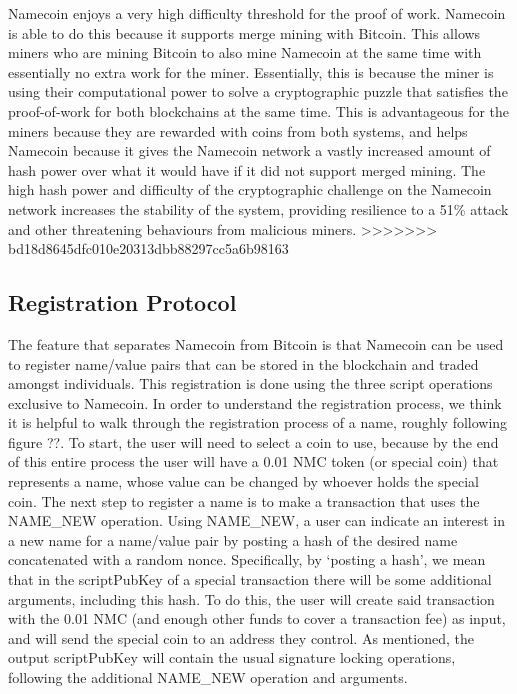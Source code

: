 Namecoin enjoys a very high difficulty threshold for the proof of work. Namecoin is able to do this because it supports merge mining with Bitcoin. This allows miners who are mining Bitcoin to also mine Namecoin at the same time with essentially no extra work for the miner. Essentially, this is because the miner is using their computational power to solve a cryptographic puzzle that satisfies the proof-of-work for both blockchains at the same time. This is advantageous for the miners because they are rewarded with coins from both systems, and helps Namecoin because it gives the Namecoin network a vastly increased amount of hash power over what it would have if it did not support merged mining. The high hash power and difficulty of the cryptographic challenge on the Namecoin network increases the stability of the system, providing resilience to a 51\% attack and other threatening behaviours from malicious miners. 
>>>>>>> bd18d8645dfc010e20313dbb88297cc5a6b98163


\subsection{Registration Protocol}
The feature that separates Namecoin from Bitcoin is that Namecoin can be used to register name/value pairs that can be stored in the blockchain and traded amongst individuals. This registration is done using the three script operations exclusive to Namecoin. In order to understand the registration process, we think it is helpful to walk through the registration process of a name, roughly following figure ??. To start, the user will need to select a coin to use, because by the end of this entire process the user will have a 0.01 NMC token (or special coin) that represents a name, whose value can be changed by whoever holds the special coin. The next step to register a name is to make a transaction that uses the NAME\_NEW  operation. Using NAME\_NEW, a user can indicate an interest in a new name for a name/value pair by posting a hash of the desired name concatenated with a random nonce. Specifically, by ‘posting a hash', we mean that in the scriptPubKey of a special transaction there will be some additional arguments, including this hash. To do this, the user will create said transaction with the 0.01 NMC (and enough other funds to cover a transaction fee) as input, and will send the special coin to an address they control. As mentioned, the output scriptPubKey will contain the usual signature locking operations, following the additional NAME\_NEW operation and arguments.

